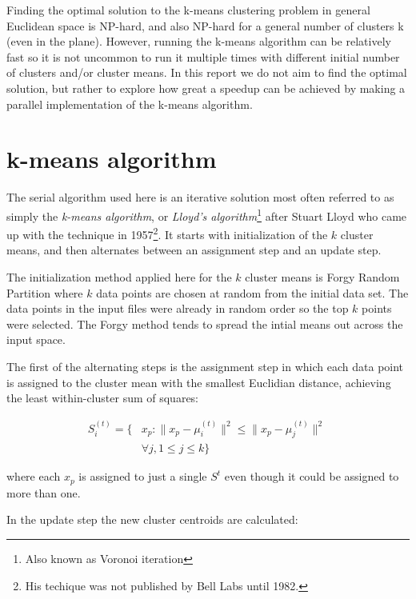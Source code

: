 \documentclass[parskip=true]{scrartcl}
\begin{document}
Finding the optimal solution to the k-means clustering problem in general Euclidean space is NP-hard\cite{Aloise2009}, and also NP-hard for a general number of clusters k (even in the plane)\cite{Mahajan2009}. However, running the k-means algorithm can be relatively fast so it is not uncommon to run it multiple times with different initial number of clusters and/or cluster means. In this report we do not aim to find the optimal solution, but rather to explore how great a speedup can be achieved by making a parallel implementation of the k-means algorithm.


\section{k-means algorithm}
The serial algorithm used here is an iterative solution most often referred to as simply the \textit{k-means algorithm}, or \textit{Lloyd's algorithm}\footnote{Also known as Voronoi iteration} after Stuart Lloyd who came up with the technique in 1957\footnote{His techique was not published by Bell Labs until 1982.}\cite{Lloyd}. It starts with initialization of the $k$ cluster means, and then alternates between an assignment step and an update step.

The initialization method applied here for the $k$ cluster means is Forgy Random Partition where $k$ data points are chosen at random from the initial data set. The data points in the input files were already in random order so the top $k$ points were selected. The Forgy method tends to spread the intial means out across the input space.\cite{hamerly2002alternatives}

The first of the alternating steps is the assignment step in which each data point is assigned to the cluster mean with the smallest Euclidian distance, achieving the least within-cluster sum of squares:

\begin{equation}
\begin{split}
S_i^{(t)} = \big \{& x_p : \big \| x_p - \mu^{(t)}_i \big \|^2 \le \big \| x_p - \mu^{(t)}_j \big \|^2 \ \\
& \forall j, 1 \le j \le k \big\}
\end{split}
\end{equation}

where each $x_p$ is assigned to just a single $S^t$ even though it could be assigned to more than one.

In the update step the new cluster centroids are calculated:
\end{document}
